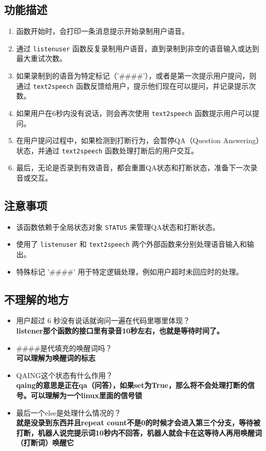 \documentclass[]{article}
\begin{document}
\subsection{功能描述}
\begin{enumerate}
	\item 函数开始时，会打印一条消息提示开始录制用户语音。
	\item 通过 \texttt{listenuser} 函数反复录制用户语音，直到录制到非空的语音输入或达到最大重试次数。
	\item 如果录制到的语音为特定标记（'\#\#\#\#'），或者是第一次提示用户提问，则通过 \texttt{text2speech} 函数反馈给用户，提示他们现在可以提问，并记录提示次数。
	\item 如果用户在6秒内没有说话，则会再次使用 \texttt{text2speech} 函数提示用户可以提问。
	\item 在用户提问过程中，如果检测到打断行为，会暂停QA（Question Answering）状态，并通过 \texttt{text2speech} 函数处理打断后的用户交互。
	\item 最后，无论是否录到有效语音，都会重置QA状态和打断状态，准备下一次录音或交互。
\end{enumerate}

\subsection{注意事项}
\begin{itemize}
	\item 该函数依赖于全局状态对象 \texttt{STATUS} 来管理QA状态和打断状态。
	\item 使用了 \texttt{listenuser} 和 \texttt{text2speech} 两个外部函数来分别处理语音输入和输出。
	\item 特殊标记 '\#\#\#\#' 用于特定逻辑处理，例如用户超时未回应时的处理。
\end{itemize}
\subsection{不理解的地方}
\begin{itemize}
	\item 用户超过 6 秒没有说话就询问一遍在代码里哪里体现？\\
	\textbf{listener那个函数的接口里有录音10秒左右，也就是等待时间了。}
	\item \#\#\#\#是代填充的唤醒词吗？\\
	\textbf{可以理解为唤醒词的标志}
	\item QAING这个状态有什么作用？\\
\textbf{	qaing的意思是正在qa（问答），如果set为True，那么将不会处理打断的信号。可以理解为一个linux里面的信号锁}
	\item 最后一个else是处理什么情况的？\\
\textbf{	就是没录到东西并且repeat count不是0的时候才会进入第三个分支，等待被打断，机器人说完提示词10秒内不回答，机器人就会卡在这等待人再用唤醒词（打断词）唤醒它}
\end{itemize}
\end{document}

